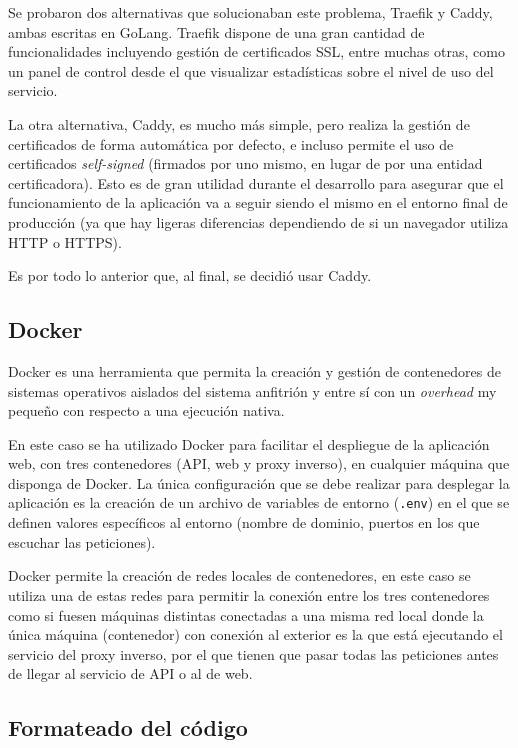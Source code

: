 Se probaron dos alternativas que solucionaban este problema, Traefik y Caddy,
ambas escritas en GoLang. Traefik dispone de una gran cantidad de
funcionalidades incluyendo gestión de certificados SSL, entre muchas otras, como
un panel de control desde el que visualizar estadísticas sobre el nivel de uso
del servicio.

La otra alternativa, Caddy, es mucho más simple, pero realiza la gestión de
certificados de forma automática por defecto, e incluso permite el uso de
certificados \textit{self-signed} (firmados por uno mismo, en lugar de por una
entidad certificadora). Esto es de gran utilidad durante el desarrollo para
asegurar que el funcionamiento de la aplicación va a seguir siendo el mismo en
el entorno final de producción (ya que hay ligeras diferencias dependiendo de si
un navegador utiliza HTTP o HTTPS).

Es por todo lo anterior que, al final, se decidió usar Caddy.


\subsection{Docker}

Docker es una herramienta que permita la creación y gestión de contenedores de
sistemas operativos aislados del sistema anfitrión y entre sí con un
\textit{overhead} my pequeño con respecto a una ejecución nativa.

En este caso se ha utilizado Docker para facilitar el despliegue de la
aplicación web, con tres contenedores (API, web y proxy inverso), en cualquier
máquina que disponga de Docker. La única configuración que se debe realizar para
desplegar la aplicación es la creación de un archivo de variables de entorno
(\texttt{.env}) en el que se definen valores específicos al entorno (nombre de
dominio, puertos en los que escuchar las peticiones).

Docker permite la creación de redes locales de contenedores, en este caso se
utiliza una de estas redes para permitir la conexión entre los tres contenedores
como si fuesen máquinas distintas conectadas a una misma red local donde la
única máquina (contenedor) con conexión al exterior es la que está ejecutando el
servicio del proxy inverso, por el que tienen que pasar todas las peticiones
antes de llegar al servicio de API o al de web.


\subsection{Formateado del código}

